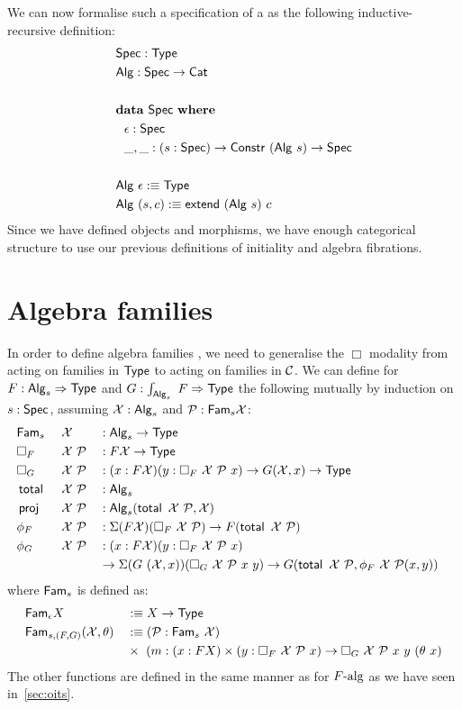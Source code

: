 \documentclass[a4paper,10pt]{report}
\begin{document}
We can now formalise such a specification of a \hit as the following
inductive-recursive definition:
%
\begin{align*}
  &\mathsf{Spec} : \mathsf{Type} \\
  &\mathsf{Alg} : \mathsf{Spec} \to \mathsf{Cat} \\
  \\
  &{\bf data}\ \mathsf{Spec}\ {\bf where} \\
  &\ \ \epsilon : \mathsf{Spec} \\
  &\ \ \_,\_ : (s : \mathsf{Spec}) \to \mathsf{Constr}\ (\mathsf{Alg}\ s) \to \mathsf{Spec} \\
  \\
  &\mathsf{Alg}\ \epsilon :\equiv \mathsf{Type}\\
  &\mathsf{Alg}\ (s , c) :\equiv \mathsf{extend}\ (\mathsf{Alg}\ s)\ c
\end{align*}
%
Since we have defined objects and morphisms, we have enough
categorical structure to use our previous definitions of initiality
and algebra fibrations. 

\section{Algebra families}
\label{sec:algfamhits}
In order to define algebra families , we need to generalise the $\Box$
modality from acting on families in $\mathsf{Type}$ to acting on families in
$\mathcal{C}$. We can define for $F : \mathsf{Alg}_s \Rightarrow \mathsf{Type}$ and
$G : \int_{\mathsf{Alg}_s}\ F \Rightarrow \mathsf{Type}$ the following mutually by induction
on $s : \mathsf{Spec}$, assuming $\mathcal{X} : \mathsf{Alg}_s$ and
$\mathcal{P} : \mathsf{Fam}_s \mathcal{X}$:
%
\begin{alignat*}{4}
  &\Fam_s\ &&\alg{X}             &&: \Alg_s \to \Type&\\
  &\Box_F\ &&\alg{X}\ \algfam{P} &&: F \alg{X} \to \Type&\\
  &\Box_G\ &&\alg{X}\ \algfam{P} &&: (x : F \alg{X}) (y : \Box_F\ \alg{X} \ \algfam{P}\ x) \to G (\alg{X} , x) \to \Type&\\
  &\total\ &&\alg{X}\ \algfam{P} &&: \Alg_s&\\
  &\proj\  &&\alg{X}\ \algfam{P} &&: \Alg_s(\total\ \alg{X}\ \algfam{P}, \alg{X})&\\
  &\phi_F\ &&\alg{X}\ \algfam{P} &&: \Sigma (F \alg{X}) (\Box_F\ \alg{X}\ \algfam{P}) \to F (\total\ \alg{X}\ \algfam{P})&\\
  &\phi_G\ &&\alg{X}\ \algfam{P} &&: (x : F \alg{X}) (y : \Box_F\ \alg{X} \ \algfam{P}\ x) &\\
  &&&&&\to \Sigma (G\ (\alg{X},x)) (\Box_G\ \alg{X}\ \algfam{P}\ x\ y) 
            \to G (\total\ \alg{X}\ \algfam{P}, \phi_F\ \alg{X}\ \algfam{P} (x , y)) &
\end{alignat*}
%
where $\mathsf{Fam}_s$ is defined as:
\begin{align*}
  &\Fam_\epsilon X &&\ddefeq X \to \Type \\
  &\Fam_{s,(F,G)} (\alg{X},\theta) &&\ddefeq (\algfam{P} : \Fam_s\ \alg{X}) \\ 
  &&&\times\ (m : (x : FX) \times (y : \Box_F\ \alg{X}\ \algfam{P}\ x) \to \Box_G\ \alg{X}\ \algfam{P}\ x\ y\ (\theta\ x)
\end{align*}
%
The other functions are defined in the same manner as for $F\mbox{-alg}$
as we have seen in~\cref{sec:oits}.
\end{document}
